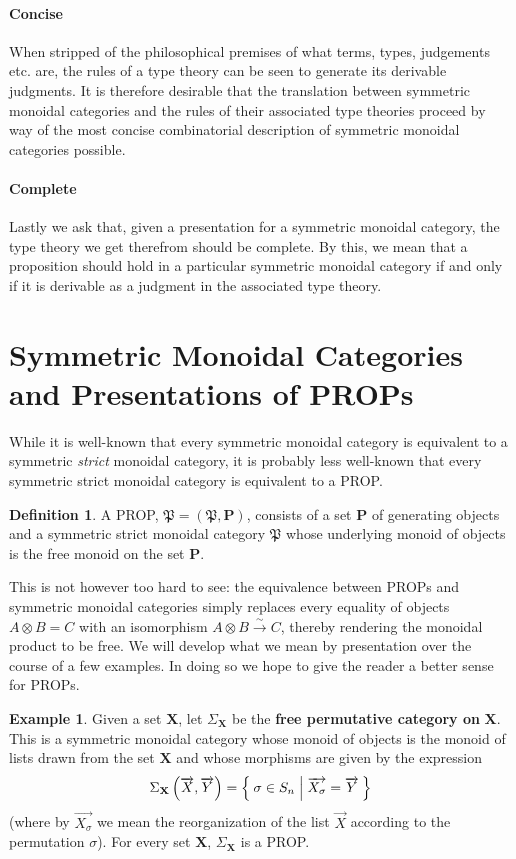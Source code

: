 \documentclass[pra,floatfix,
amsmath,superscriptaddress, 12pt]{article}
\theoremstyle{definition}
\newtheorem{definition}{Definition}
\newtheorem*{example}{Example}
\begin{document}
\paragraph{Concise} When stripped of the philosophical premises of what terms, types, judgements etc. are, the rules of a type theory can be seen to generate its derivable judgments. It is therefore desirable that the translation between symmetric monoidal categories and the rules of their associated type theories proceed by way of the most concise combinatorial description of symmetric monoidal categories possible.

\paragraph{Complete} Lastly we ask that, given a presentation for a symmetric monoidal category, the type theory we get therefrom should be complete. By this, we mean that a proposition should hold in a particular symmetric monoidal category if and only if it is derivable as a judgment in the associated type theory.

\section{Symmetric Monoidal Categories and Presentations of \textsf{PROP}s}

While it is well-known that every symmetric monoidal category is equivalent
to a symmetric \emph{strict} monoidal category, it is probably less well-known that every symmetric strict monoidal category is equivalent to
a \textsf{PROP}.

\begin{definition} A \textsf{PROP}, $\mathfrak{P}=(\mathfrak{P},\mathbf{P})$, consists of a set $\mathbf{P}$ of generating objects and a symmetric strict monoidal category $\mathfrak{P}$ whose underlying monoid of objects is the free monoid on the set $\mathbf{P}$.
\end{definition}

This is not however too hard to see: the equivalence between \textsf{PROP}s and symmetric monoidal categories simply replaces every equality of objects $A\otimes B = C$ with an isomorphism $A \otimes B \overset{\sim}{\longrightarrow} C$, thereby rendering the monoidal product to be free. We will develop what we mean by presentation over the course of a few examples. In doing so we hope to give the reader a better sense for \textsf{PROP}s.

\begin{example}
Given a set $\mathbf{X}$, let $\Sigma_{\mathbf{X}}$ be the \textbf{free permutative category on} $\mathbf{X}$. This is a symmetric monoidal category whose monoid of objects is the monoid of lists drawn from the set $\mathbf{X}$ and whose morphisms are given by the expression
\[
    \Sigma_{\mathbf{X}}\left(\overrightarrow{X},\overrightarrow{Y}\right)
    =
    \Set{\sigma \in S_{n} | \overrightarrow{X_\sigma}=\overrightarrow{Y}}
\]
(where by $\overrightarrow{X_\sigma}$ we mean the reorganization of the list $\overrightarrow{X}$ according to the permutation $\sigma$). For every set $\mathbf{X}$, $\Sigma_{\mathbf{X}}$ is a \textsf{PROP}.
\end{example}
\end{document}
